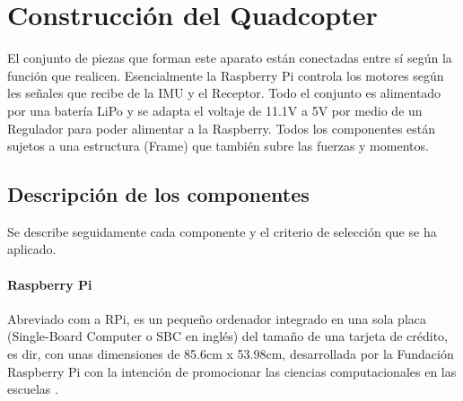 \documentclass[twoside,11pt]{book}
\begin{document}
\newpage
\chapter{Construcción del Quadcopter} \label{construc}
El conjunto de piezas que forman este aparato están conectadas entre sí según la función que realicen. Esencialmente la Raspberry Pi controla los motores según les señales que recibe de la IMU y el Receptor. Todo el conjunto es alimentado por una batería LiPo y se adapta el voltaje de 11.1V a 5V por medio de un Regulador para poder alimentar a la Raspberry. Todos los componentes están sujetos a una estructura (Frame) que también subre las fuerzas y momentos.  

\section{Descripción de los componentes}
Se describe seguidamente cada componente y el criterio de selección que se ha aplicado.
\subsubsection*{Raspberry Pi} 
Abreviado com a RPi, es un pequeño ordenador integrado en una sola placa (Single-Board Computer o SBC en inglés) del tamaño de una tarjeta de crédito, es dir, con unas dimensiones de 85.6cm x 53.98cm, desarrollada por la Fundación Raspberry Pi con la intención de promocionar las ciencias computacionales en las escuelas \cite{RPiWiki}. 
\end{document}
